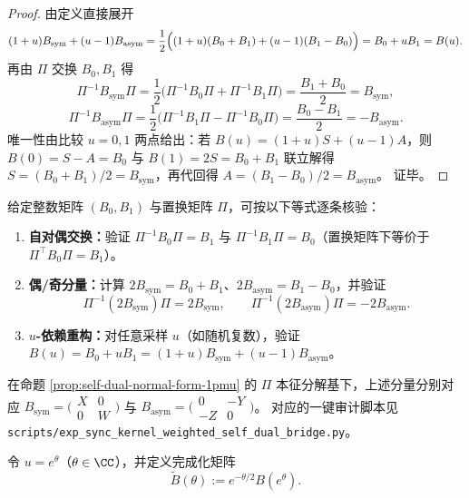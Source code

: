 \begin{proof}
由定义直接展开
\[
(1+u)B_{\mathrm{sym}}+(u-1)B_{\mathrm{asym}}
=\frac12\Bigl((1+u)(B_0+B_1)+(u-1)(B_1-B_0)\Bigr)
=B_0+uB_1
=B(u).
\]
再由 \(\Pi\) 交换 \(B_0,B_1\) 得
\[
\Pi^{-1}B_{\mathrm{sym}}\Pi
=\frac{1}{2}\bigl(\Pi^{-1}B_0\Pi+\Pi^{-1}B_1\Pi\bigr)
=\frac{B_1+B_0}{2}
=B_{\mathrm{sym}},
\]
\[
\Pi^{-1}B_{\mathrm{asym}}\Pi
=\frac{1}{2}\bigl(\Pi^{-1}B_1\Pi-\Pi^{-1}B_0\Pi\bigr)
=\frac{B_0-B_1}{2}
=-B_{\mathrm{asym}}.
\]
唯一性由比较 \(u=0,1\) 两点给出：若 \(B(u)=(1+u)S+(u-1)A\)，则
\(
B(0)=S-A=B_0
\)
与
\(
B(1)=2S=B_0+B_1
\)
联立解得 \(S=(B_0+B_1)/2=B_{\mathrm{sym}}\)，再代回得 \(A=(B_1-B_0)/2=B_{\mathrm{asym}}\)。
证毕。
\end{proof}

\begin{remark}\label{rem:sync-kernel-even-odd-bridge}
给定整数矩阵 \((B_0,B_1)\) 与置换矩阵 \(\Pi\)，可按以下等式逐条核验：
\begin{enumerate}
  \item \textbf{自对偶交换：}验证 \(\Pi^{-1}B_0\Pi=B_1\) 与 \(\Pi^{-1}B_1\Pi=B_0\)（置换矩阵下等价于 \(\Pi^\top B_0\Pi=B_1\)）。
  \item \textbf{偶/奇分量：}计算 \(2B_{\mathrm{sym}}=B_0+B_1\)、\(2B_{\mathrm{asym}}=B_1-B_0\)，并验证
  \[
  \Pi^{-1}(2B_{\mathrm{sym}})\Pi=2B_{\mathrm{sym}},\qquad
  \Pi^{-1}(2B_{\mathrm{asym}})\Pi=-2B_{\mathrm{asym}}.
  \]
  \item \textbf{\(u\)-依赖重构：}对任意采样 \(u\)（如随机复数），验证
  \(
  B(u)=B_0+uB_1=(1+u)B_{\mathrm{sym}}+(u-1)B_{\mathrm{asym}}
  \)。
\end{enumerate}
在命题 \ref{prop:self-dual-normal-form-1pmu} 的 \(\Pi\) 本征分解基下，上述分量分别对应
\(
B_{\mathrm{sym}}=\bigl(\begin{smallmatrix}X&0\\0&W\end{smallmatrix}\bigr)
\)
与
\(
B_{\mathrm{asym}}=\bigl(\begin{smallmatrix}0&-Y\\-Z&0\end{smallmatrix}\bigr)
\)。
对应的一键审计脚本见 \texttt{scripts/exp\_sync\_kernel\_weighted\_self\_dual\_bridge.py}。
\end{remark}

\begin{definition}[完成化矩阵]\label{def:completed-matrix}
令 \(u=e^{\theta}\)（\(\theta\in\CC\)），并定义完成化矩阵
\[
\widetilde B(\theta):=e^{-\theta/2}B(e^{\theta}).
\]
\end{definition}


